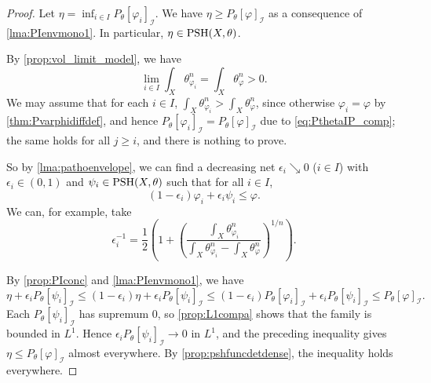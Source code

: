 \begin{proof}
    Let $\eta=\inf_{i\in I} P_{\theta}[\varphi_i]_{\mathcal{I}}$. We have $\eta\geq P_{\theta}[\varphi]_{\mathcal{I}}$ as a consequence of \cref{lma:PIenvmono1}. In particular, $\eta\in \mathrm{PSH}(X,\theta)$.

    By \cref{prop:vol_limit_model}, we have
    \[
        \lim_{i\in I} \int_X\theta_{\varphi_i}^n=\int_X\theta_{\varphi}^n>0.
    \]
    We may assume that for each $i\in I$, $\int_X\theta_{\varphi_i}^n>\int_X\theta_{\varphi}^n$, since otherwise $\varphi_i=\varphi$ by \cref{thm:Pvarphidiffdef}, and hence $P_{\theta}[\varphi_i]_{\mathcal{I}}=P_{\theta}[\varphi]_{\mathcal{I}}$ due to \eqref{eq:PthetaIP_comp}; the same holds for all $j\geq i$, and there is nothing to prove.

    So by \cref{lma:pathoenvelope}, we can find a decreasing net $\epsilon_i\searrow 0$ ($i\in I$) with $\epsilon_i\in (0,1)$ and $\psi_i\in \mathrm{PSH}(X,\theta)$ such that for all $i\in I$,
    \[
        (1-\epsilon_i) \varphi_i+\epsilon_i\psi_i\leq \varphi.
    \]
    We can, for example, take
    \[
        \epsilon_i^{-1}=\frac{1}{2}\left( 1+\left(\frac{\int_X \theta_{\varphi_i}^n}{\int_X \theta_{\varphi_i}^n-\int_X \theta_{\varphi}^n}\right)^{1/n} \right).
    \]

    By \cref{prop:PIconc} and \cref{lma:PIenvmono1}, we have
    \[
        \eta+\epsilon_i P_{\theta}[\psi_i]_{\mathcal{I}}\leq (1-\epsilon_i) \eta+\epsilon_i P_{\theta}[\psi_i]_{\mathcal{I}}\leq (1-\epsilon_i) P_{\theta}[\varphi_i]_{\mathcal{I}}+\epsilon_i P_{\theta}[\psi_i]_{\mathcal{I}}\leq P_{\theta}[\varphi]_{\mathcal{I}}.
    \]
    Each $P_{\theta}[\psi_i]_{\mathcal{I}}$ has supremum $0$, so \cref{prop:L1compa} shows that the family is bounded in $L^1$. Hence $\epsilon_iP_{\theta}[\psi_i]_{\mathcal{I}}\to 0$ in $L^1$, and the preceding inequality gives $\eta\leq P_{\theta}[\varphi]_{\mathcal{I}}$ almost everywhere. By \cref{prop:pshfuncdetdense}, the inequality holds everywhere.
\end{proof}


